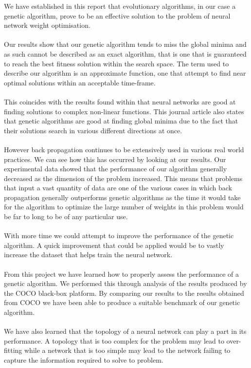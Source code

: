 \documentclass[12pt]{article}
\begin{document}
We have established in this report that evolutionary algorithms, in our case a genetic algorithm, prove to be an effective solution to the problem of neural network weight optimisation. \\\\
Our results show that our genetic algorithm tends to miss the global minima and as such cannot be described as an exact algorithm, that is one that is guaranteed to reach the best fitness solution within the search space. The term used to describe our algorithm is an approximate function, one that attempt to find near optimal solutions within an acceptable time-frame. \\\\
This coincides with the results found within \cite{GlobalOpt} that neural networks are good at finding solutions to complex non-linear functions. This journal article also states that genetic algorithms are good at finding global minima due to the fact that their solutions search in various different directions at once.\\\\
However back propagation continues to be extensively used in various real world practices. We can see how this has occurred by looking at our results. Our experimental data showed that the performance of our algorithm generally decreased as the dimension of the problem increased. This means that problems that input a vast quantity of data are one of the various cases in which back propagation generally outperforms genetic algorithms as the time it would take for  the algorithm to optimize the large number of weights in this problem would be far to long to be of any particular use.\\\\
With more time we could attempt to improve the performance of the genetic algorithm. A quick improvement that could be applied would be to vastly increase the dataset that helps train the neural network.\\\\
From this project we have learned how to properly assess the performance of a genetic algorithm. We performed this through analysis of the results produced by the COCO black-box platform. By comparing our results to the results obtained from COCO we have been able to produce a suitable benchmark of our genetic algorithm.\\\\
We have also learned that the topology of a neural network can play a part in its performance. A topology that is too complex for the problem may lead to over-fitting while a network that is too simple may lead to the network failing to capture the information required to solve to problem.\\\\
\end{document}
